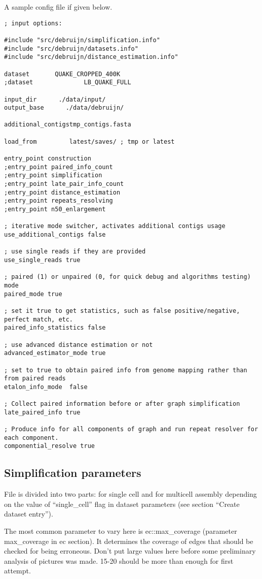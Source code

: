 \documentclass{article}
\begin{document}
A sample config file if given below.
\begin{lstlisting}
; input options:

#include "src/debruijn/simplification.info"
#include "src/debruijn/datasets.info"
#include "src/debruijn/distance_estimation.info"

dataset       QUAKE_CROPPED_400K
;dataset              LB_QUAKE_FULL

input_dir      ./data/input/
output_base      ./data/debruijn/

additional_contigstmp_contigs.fasta

load_from         latest/saves/ ; tmp or latest 

entry_point construction
;entry_point paired_info_count
;entry_point simplification
;entry_point late_pair_info_count
;entry_point distance_estimation
;entry_point repeats_resolving
;entry_point n50_enlargement

; iterative mode switcher, activates additional contigs usage
use_additional_contigs false

; use single reads if they are provided
use_single_reads true

; paired (1) or unpaired (0, for quick debug and algorithms testing) mode
paired_mode true

; set it true to get statistics, such as false positive/negative, perfect match, etc.
paired_info_statistics false

; use advanced distance estimation or not
advanced_estimator_mode true

; set to true to obtain paired info from genome mapping rather than from paired reads
etalon_info_mode  false

; Collect paired information before or after graph simplification
late_paired_info true

; Produce info for all components of graph and run repeat resolver for each component.
componential_resolve true
\end{lstlisting}

\subsection{Simplification parameters}

File is divided into two parts: for single cell and for multicell assembly depending on the value of ``single\_cell'' flag in dataset parameters (see section ``Create dataset entry'').

The most common parameter to vary here is ec::max\_coverage (parameter max\_coverage in ec section). It determines the coverage of edges that should be checked for being erroneous. Don't put large values here before some preliminary analysis of pictures was made. 15-20 should be more than enough for first attempt.
\end{document}
